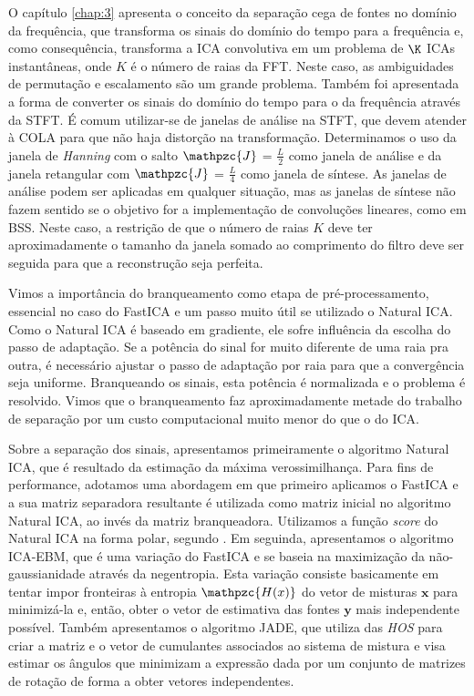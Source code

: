O capítulo \ref{chap:3} apresenta o conceito da separação cega de fontes no domínio da frequência, que transforma os sinais do domínio do tempo para a frequência e, como consequência, transforma a ICA convolutiva em um problema de $\K$ ICAs instantâneas, onde ${K}$ é o número de raias da FFT. Neste caso, as ambiguidades de permutação e escalamento são um grande problema. Também foi apresentada a forma de converter os sinais do domínio do tempo para o da frequência através da STFT. É comum utilizar-se de janelas de análise na STFT, que devem atender à COLA para que não haja distorção na transformação. Determinamos o uso da janela de \textit{Hanning} com o salto $\mathpzc{J}$ = $\frac{L}{2}$ como janela de análise e da janela retangular com  $\mathpzc{J}$ = $\frac{L}{4}$ como janela de síntese. As janelas de análise podem ser aplicadas em qualquer situação, mas as janelas de síntese não fazem sentido se o objetivo for a implementação de convoluções lineares, como em BSS. Neste caso, a restrição de que o número de raias ${K}$ deve ter aproximadamente o tamanho da janela somado ao comprimento do filtro deve ser seguida para que a reconstrução seja perfeita. 

Vimos a importância do branqueamento como etapa de pré-processamento, essencial no caso do FastICA e um passo muito útil se utilizado o Natural ICA. Como o Natural ICA é baseado em gradiente, ele sofre influência da escolha do passo de adaptação. Se a potência do sinal for muito diferente de uma raia pra outra, é necessário ajustar o passo de adaptação por raia para que a convergência seja uniforme. Branqueando os sinais, esta potência é normalizada e o problema é resolvido. Vimos que o branqueamento faz aproximadamente metade do trabalho de separação por um custo computacional muito menor do que o do ICA.
 
Sobre a separação dos sinais, apresentamos primeiramente o algoritmo Natural ICA, que é resultado da estimação da máxima verossimilhança. Para fins de performance, adotamos uma abordagem em que primeiro aplicamos o FastICA e a sua matriz separadora resultante é utilizada como matriz inicial no algoritmo Natural ICA, ao invés da matriz branqueadora. Utilizamos a função \textit{score} do Natural ICA na forma polar, segundo \cite{LuizVictorio}. Em seguinda, apresentamos o algoritmo ICA-EBM, que é uma variação do FastICA e se baseia na maximização da não-gaussianidade através da negentropia. Esta variação consiste basicamente em tentar impor fronteiras à entropia $\mathpzc{H(x)}$ do vetor de misturas $\mathbf{x}$ para minimizá-la e, então, obter o vetor de estimativa das fontes $\mathbf{y}$ mais independente possível. Também apresentamos o algoritmo JADE, que utiliza das \textit{HOS} para criar a matriz e o vetor de cumulantes associados ao sistema de mistura e visa estimar os ângulos que minimizam a expressão dada por um conjunto de matrizes de rotação de forma a obter vetores independentes.

